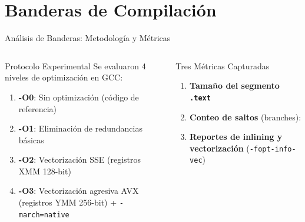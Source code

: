 \documentclass[aspectratio=169,10pt]{beamer}
\begin{document}
\section{Banderas de Compilación}

\begin{frame}[allowframebreaks]{Análisis de Banderas: Metodología y Métricas}
\begin{columns}[T]
\begin{physbox}{Protocolo Experimental}
Se evaluaron 4 niveles de optimización en GCC:
\begin{enumerate}
  \item \textbf{-O0}: Sin optimización (código de referencia)
  \item \textbf{-O1}: Eliminación de redundancias básicas
  \item \textbf{-O2}: Vectorización SSE (registros XMM 128-bit)
  \item \textbf{-O3}: Vectorización agresiva AVX (registros YMM 256-bit) + \texttt{-march=native}
\end{enumerate}
\end{physbox}
\vspace{-0.18cm}
\begin{block}{Tres Métricas Capturadas}
\begin{enumerate}\setlength\itemsep{3pt}
  \item \textbf{Tamaño del segmento \texttt{.text}} 
  \item \textbf{Conteo de saltos} (branches): 
  \item \textbf{Reportes de inlining y vectorización} (\texttt{-fopt-info-vec})
\end{enumerate}
\end{block}


\end{columns}
\end{frame}
\end{document}
